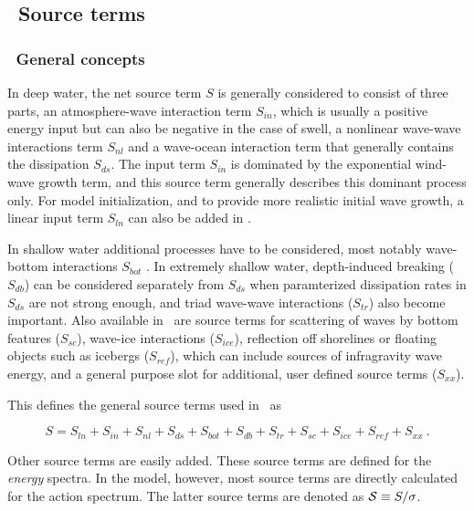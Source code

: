 \vssub
\subsection{~Source terms}
\vsssub
\subsubsection{~General concepts}
\vsssub

In deep water, the net source term $S$ is generally considered to consist of
three parts, an atmosphere-wave interaction term $S_{in}$, which 
is usually a positive energy input but can also be negative in the case of swell, a nonlinear wave-wave
interactions term $S_{nl}$ and a wave-ocean interaction term that generally contains the dissipation 
$S_{ds}$. The input term $S_{in}$ is dominated by the
exponential wind-wave growth term, and this source term generally describes this
dominant process only. For model initialization, and to provide more realistic
initial wave growth, a linear input term $S_{ln}$ can also be added in
\ws.

In shallow water additional processes have to be considered, most notably
wave-bottom interactions $S_{bot}$ \cite[e.g.,][]{pro:Sea78}. In extremely
shallow water, depth-induced breaking ($S_{db}$) can be considered separately from $S_{ds}$ when 
paramterized dissipation rates in $S_{ds}$ are not strong enough, and triad wave-wave
interactions ($S_{tr}$) also become important. Also available in \ws\ are source
terms for scattering of waves by bottom features ($S_{sc}$), wave-ice
interactions ($S_{ice}$), reflection off shorelines or floating objects such
as icebergs ($S_{ref}$), which can include sources of infragravity wave energy, and a general purpose slot for additional, user
defined source terms ($S_{xx}$).

This defines the general source terms used in \ws\ as


\begin{equation}
S = S_{ln} + S_{in} + S_{nl} + S_{ds} + S_{bot} + S_{db} + S_{tr} +
    S_{sc} + S_{ice} + S_{ref} + S_{xx}\: .
\label{eq:general_st}
\end{equation}

\noindent
Other source terms are easily added. These source terms are defined for the
{\em energy} spectra. In the model, however, most source terms are directly
calculated for the action spectrum. The latter source terms are denoted as
${\cal S} \equiv S/\sigma$.

